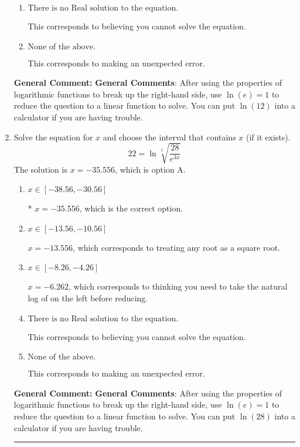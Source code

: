 \documentclass{extbook}[14pt]
\newcommand{\litem}[1]{\item #1

\rule{\textwidth}{0.4pt}}
\begin{document}
\begin{enumerate}
{\begin{enumerate}[label=\Alph*.]
* $x = -2.745$, which is the correct option.
\item \( \text{There is no Real solution to the equation.} \)

This corresponds to believing you cannot solve the equation.
\item \( \text{None of the above.} \)

This corresponds to making an unexpected error.
\end{enumerate}

\textbf{General Comment:} \textbf{General Comments}: After using the properties of logarithmic functions to break up the right-hand side, use $\ln(e) = 1$ to reduce the question to a linear function to solve. You can put $\ln(12)$ into a calculator if you are having trouble.
}
\litem{
 Solve the equation for $x$ and choose the interval that contains $x$ (if it exists).
\[  22 = \ln{\sqrt[5]{\frac{28}{e^{3x}}}} \]The solution is \( x = -35.556 \), which is option A.\begin{enumerate}[label=\Alph*.]
\item \( x \in [-38.56, -30.56] \)

* $x = -35.556$, which is the correct option.
\item \( x \in [-13.56, -10.56] \)

$x = -13.556$, which corresponds to treating any root as a square root.
\item \( x \in [-8.26, -4.26] \)

$x = -6.262$, which corresponds to thinking you need to take the natural log of on the left before reducing.
\item \( \text{There is no Real solution to the equation.} \)

This corresponds to believing you cannot solve the equation.
\item \( \text{None of the above.} \)

This corresponds to making an unexpected error.
\end{enumerate}

\textbf{General Comment:} \textbf{General Comments}: After using the properties of logarithmic functions to break up the right-hand side, use $\ln(e) = 1$ to reduce the question to a linear function to solve. You can put $\ln(28)$ into a calculator if you are having trouble.
}
\end{enumerate}
\end{document}

